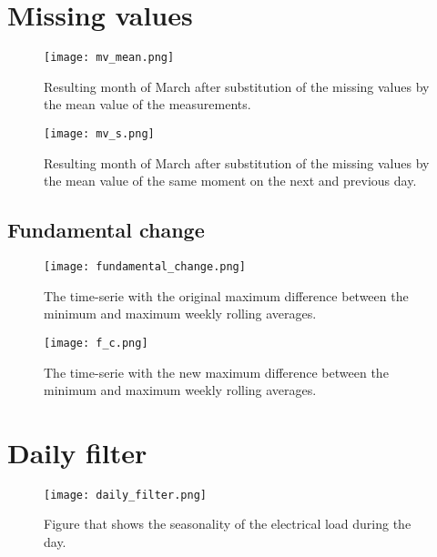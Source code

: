 \section{Missing values}

\begin{figure}[h!]
	\centering
	\texttt{[image: mv\_mean.png]}
	\caption{Resulting month of March after substitution of the missing values by the mean value of the measurements. }
	\label{fig:mv_mean}
\end{figure}

\begin{figure}[h!]
	\centering
	\texttt{[image: mv\_s.png]}
	\caption{Resulting month of March after substitution of the missing values by the mean value of the same moment on the next and previous day.}
	\label{fig:mv_s}
\end{figure}






\subsection{Fundamental change}

\begin{figure}[h!]
	\centering
	\texttt{[image: fundamental\_change.png]}
	\caption{The time-serie with the original maximum difference between the minimum and maximum weekly rolling averages.}
	\label{fig:fundamental_change}
\end{figure}

\begin{figure}[h!]
	\centering
	\texttt{[image: f\_c.png]}
	\caption{The time-serie with the new maximum difference between the minimum and maximum weekly rolling averages.}
	\label{fig:f_c}
\end{figure}


\section{Daily filter}
\begin{figure}[h!]
	\centering
	\texttt{[image: daily\_filter.png]}
	\caption{Figure that shows the seasonality of the electrical load during the day.}
	\label{fig:daily_filter}
\end{figure}



